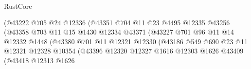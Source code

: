 \begin{lexlean}{RustCore}
\begin{coremodule}
                                        (@43222
                                          @705
                                          @24
                                          @12336
                                          (@43351
                                            @704
                                            @11
                                            @23
                                            @4495
                                            @12335
                                            @43256
                                            (@43358
                                              @703
                                              @11
                                              @15
                                              @1430
                                              @12334
                                              @43371
                                              (@43227
                                                @701
                                                @96
                                                @11
                                                @14
                                                @12332
                                                @1448
                                                (@43380
                                                  @701
                                                  @11
                                                  @12321
                                                  @12330
                                                  (@43186
                                                    @549
                                                    @690
                                                    @23
                                                    @11
                                                    @12321
                                                    @12328
                                                    @10354
                                                    (@43396
                                                      @12320
                                                      @12327
                                                      @1616
                                                      @12303
                                                      @1626
                                                      @43409
                                                      (@43418
                                                        @12313
                                                        @1626

\end{coremodule}
\end{lexlean}
